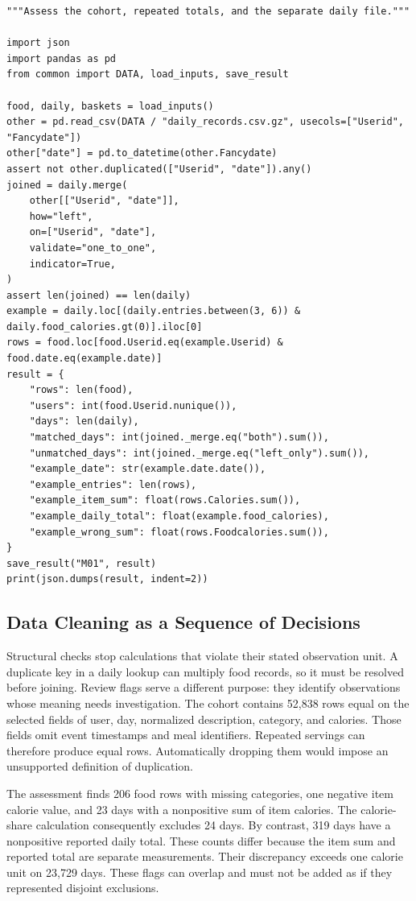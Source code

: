 \begin{Verbatim}[breaklines,breakanywhere,fontsize=\small]
"""Assess the cohort, repeated totals, and the separate daily file."""

import json
import pandas as pd
from common import DATA, load_inputs, save_result

food, daily, baskets = load_inputs()
other = pd.read_csv(DATA / "daily_records.csv.gz", usecols=["Userid", "Fancydate"])
other["date"] = pd.to_datetime(other.Fancydate)
assert not other.duplicated(["Userid", "date"]).any()
joined = daily.merge(
    other[["Userid", "date"]],
    how="left",
    on=["Userid", "date"],
    validate="one_to_one",
    indicator=True,
)
assert len(joined) == len(daily)
example = daily.loc[(daily.entries.between(3, 6)) & daily.food_calories.gt(0)].iloc[0]
rows = food.loc[food.Userid.eq(example.Userid) & food.date.eq(example.date)]
result = {
    "rows": len(food),
    "users": int(food.Userid.nunique()),
    "days": len(daily),
    "matched_days": int(joined._merge.eq("both").sum()),
    "unmatched_days": int(joined._merge.eq("left_only").sum()),
    "example_date": str(example.date.date()),
    "example_entries": len(rows),
    "example_item_sum": float(rows.Calories.sum()),
    "example_daily_total": float(example.food_calories),
    "example_wrong_sum": float(rows.Foodcalories.sum()),
}
save_result("M01", result)
print(json.dumps(result, indent=2))
\end{Verbatim}

\hypertarget{M01-data-cleaning-as-a-sequence-of-decisions}{%
\subsection{Data Cleaning as a Sequence of
Decisions}\label{M01-data-cleaning-as-a-sequence-of-decisions}}

\noindent Structural checks stop calculations that violate their stated
observation unit. A duplicate key in a daily lookup can multiply food
records, so it must be resolved before joining. Review flags serve a
different purpose: they identify observations whose meaning needs
investigation. The cohort contains 52,838 rows equal on the selected
fields of user, day, normalized description, category, and calories.
Those fields omit event timestamps and meal identifiers. Repeated
servings can therefore produce equal rows. Automatically dropping them
would impose an unsupported definition of duplication.

The assessment finds 206 food rows with missing categories, one negative
item calorie value, and 23 days with a nonpositive sum of item calories.
The calorie-share calculation consequently excludes 24 days. By
contrast, 319 days have a nonpositive reported daily total. These counts
differ because the item sum and reported total are separate
measurements. Their discrepancy exceeds one calorie unit on 23,729 days.
These flags can overlap and must not be added as if they represented
disjoint exclusions.

